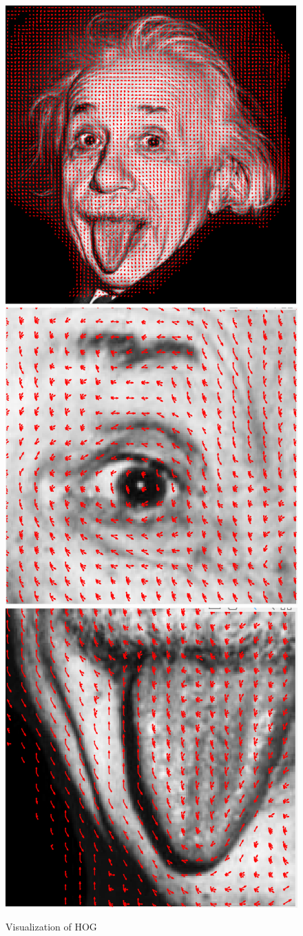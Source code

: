 \documentclass[letter, 10pt]{article}
\begin{document}
\begin{figure}[!h]
        \centering
        \includegraphics[width=0.7\linewidth]{HW1/RESULT/HOG.png}
        \label{fig:HOG IMAGE}
    \endminipage\hfill
        \centering
        \includegraphics[width=0.7\linewidth]{HW1/RESULT/HOG_EYE.png}
        \label{fig:HOG EYE IMAGE}
    \endminipage\hfill
        \centering
        \includegraphics[width=0.7\linewidth]{HW1/RESULT/HOG_TONGUE.png}
        \label{fig:HOG TONGUE IMAGE}
    \endminipage\hfill
    \caption{Visualization of HOG}
\label{fig:fig}
\end{figure}
\end{document}
